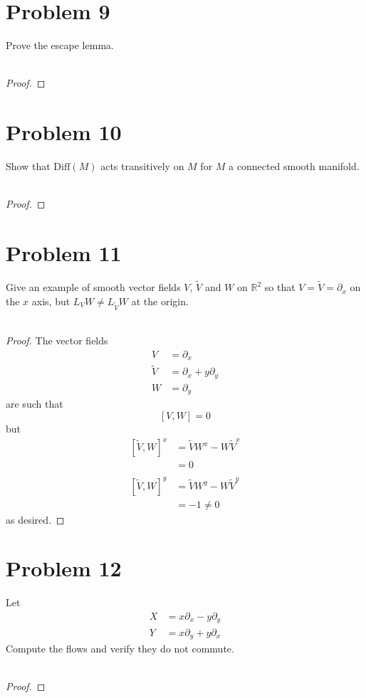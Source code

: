 \documentclass[fontsize=11pt]{scrartcl} %
\numberwithin{equation}{section} %
\numberwithin{figure}{section} %
\numberwithin{table}{section} %
\newcommand{\R}{\mathbb{R}}
\begin{document}
\section*{Problem 9}
Prove the escape lemma.
\\
\\
\begin{proof}

\end{proof}

\section*{Problem 10}
Show that $\textrm{Diff}(M)$ acts transitively on $M$ for $M$ a connected smooth
manifold.
\\
\\
\begin{proof}

\end{proof}

\section*{Problem 11}
Give an example of smooth vector fields $V$, $\tilde{V}$ and $W$ on $\R^2$ so
that $V=\tilde{V}=\partial_x$ on the $x$ axis, but $L_VW\neq L_{\tilde{V}}W$ at
the origin.
\\
\\
\begin{proof}
    The vector fields
    \[ 
        \begin{aligned}
            V &=\partial_x\\
            \tilde{V} &=\partial_x + y\partial_y\\
            W &=\partial_y
        \end{aligned}
    \]
    are such that
    \[
        [V,W] = 0
    \]
    but
    \[
        \begin{aligned}
            [\tilde{V},W]^x &= \tilde{V}W^x - W\tilde{V}^x\\
                            &= 0\\
            \\
            [\tilde{V},W]^y &= \tilde{V}W^y - W\tilde{V}^y\\
                            &= -1\neq 0
        \end{aligned}
    \]
    as desired.
\end{proof}

\section*{Problem 12}
Let
\[
    \begin{aligned}
        X &= x\partial_x - y\partial_y\\
        Y &= x\partial_y + y\partial_x
    \end{aligned}
\]
Compute the flows and verify they do not commute.
\\
\\
\begin{proof}
    
\end{proof}
\end{document}
